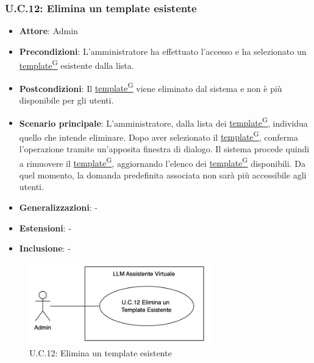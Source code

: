 \subsubsection{U.C.12: Elimina un template esistente}
\begin{itemize}
    \item \textbf{Attore}: Admin
    \item \textbf{Precondizioni}: L'amministratore ha effettuato l'accesso e ha selezionato un \href{https://code7crusaders.github.io/docs/PB/documentazione_interna/glossario.html#template}{template\textsuperscript{G}} esistente dalla lista. 
    \item \textbf{Postcondizioni}: Il \href{https://code7crusaders.github.io/docs/PB/documentazione_interna/glossario.html#template}{template\textsuperscript{G}} viene eliminato dal sistema e non è più disponibile per gli utenti.
    \item \textbf{Scenario principale}: L'amministratore, dalla lista dei \href{https://code7crusaders.github.io/docs/PB/documentazione_interna/glossario.html#template}{template\textsuperscript{G}}, individua quello che intende eliminare. Dopo aver selezionato il \href{https://code7crusaders.github.io/docs/PB/documentazione_interna/glossario.html#template}{template\textsuperscript{G}}, conferma l'operazione tramite un'apposita finestra di dialogo. Il sistema procede quindi a rimuovere il \href{https://code7crusaders.github.io/docs/PB/documentazione_interna/glossario.html#template}{template\textsuperscript{G}}, aggiornando l'elenco dei \href{https://code7crusaders.github.io/docs/PB/documentazione_interna/glossario.html#template}{template\textsuperscript{G}} disponibili. Da quel momento, la domanda predefinita associata non sarà più accessibile agli utenti.
    \item \textbf{Generalizzazioni}: -
    \item \textbf{Estensioni}: -
    \item \textbf{Inclusione}: -
\end{itemize}
\begin{figure}[H]
    \centering
    \includegraphics[width=0.7\textwidth]{img/UC12.png}
    \caption{U.C.12: Elimina un template esistente}
\end{figure}
\newpage

